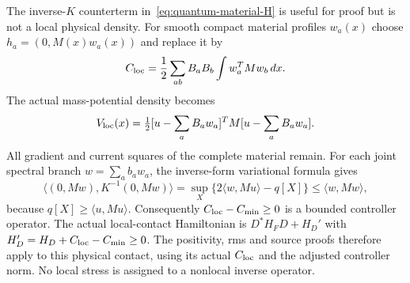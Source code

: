 The inverse-$K$ counterterm in~\eqref{eq:quantum-material-H} is useful
for proof but is not a local physical density.
For smooth compact material profiles $w_a(x)$ choose
$h_a=(0,M(x)w_a(x))$ and replace it by
\[
 C_{\rm loc}=\frac12\sum_{ab}B_aB_b\int w_a^TMw_b\,dx .
\]
The actual mass-potential density becomes
\begin{equation}
 V_{\rm loc}(x)=\tfrac12
 [u-\sum_aB_aw_a]^TM[u-\sum_aB_aw_a] .
 \label{eq:local-quantum-contact-potential}
\end{equation}
All gradient and current squares of the complete material remain.
For each joint spectral branch $w=\sum_a b_aw_a$, the inverse-form
variational formula gives
\[
 \langle(0,Mw),K^{-1}(0,Mw)\rangle
 =\sup_X\{2\langle w,Mu\rangle-q[X]\}
 \le\langle w,Mw\rangle ,
\]
because $q[X]\ge\langle u,Mu\rangle$.
Consequently $C_{\rm loc}-C_{\min}\ge0$ is a bounded controller
operator. The actual local-contact Hamiltonian is
$D^*H_FD+H_D'$ with
$H_D'=H_D+C_{\rm loc}-C_{\min}\ge0$.
The positivity, rms and source proofs therefore apply to this physical
contact, using its actual $C_{\rm loc}$ and the adjusted controller norm.
No local stress is assigned to a nonlocal inverse operator.

